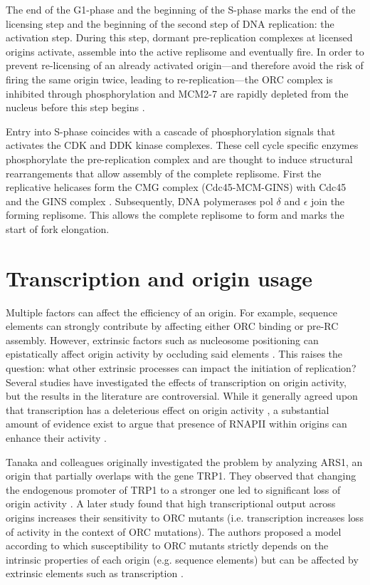 The end of the G1-phase and the beginning of the S-phase marks the end of the licensing step and the beginning of the second step of DNA replication: the activation step. 
During this step, dormant pre-replication complexes at licensed origins activate, assemble into the active replisome and eventually fire. 
In order to prevent re-licensing of an already activated origin—and therefore avoid the risk of firing the same origin twice, leading to re-replication—the ORC complex is  inhibited through phosphorylation and MCM2-7 are rapidly depleted from the nucleus before this step begins \cite{nguyen:2001:cyclindependent}. 


Entry into S-phase coincides with a cascade of phosphorylation signals that activates the CDK and DDK kinase complexes. 
These cell cycle specific enzymes phosphorylate the pre-replication complex and are thought to induce structural rearrangements that allow assembly of the complete replisome. 
First the replicative helicases form the CMG complex (Cdc45-MCM-GINS) with Cdc45 and the GINS complex \cite{moyer:2006:isolation, aparicio:2009:human}. 
Subsequently, DNA polymerases pol $\delta$ and $\epsilon$ join the forming replisome. 
This allows the complete replisome to form and marks the start of fork elongation.


\section{Transcription and origin usage}

Multiple factors can affect the efficiency of an origin.  
For example, sequence elements can strongly contribute by affecting either ORC binding or pre-RC assembly. 
However, extrinsic factors such as nucleosome positioning can epistatically affect origin activity by occluding said elements \cite{bodmerglavas:2001:rna}. 
This raises the question: what other extrinsic processes can impact the initiation of replication? Several studies have investigated the effects of transcription on origin activity, but the results in the literature are controversial. 
While it generally agreed upon that transcription has a deleterious effect on origin activity \cite{tanaka:1994:transcription,nieduszynski:2005:requirement}, a substantial amount of evidence exist to argue that presence of RNAPII within origins can enhance their activity \cite{yankulov:1999:mcm,gauthier:2002:role}. 


Tanaka and colleagues originally investigated the problem by analyzing ARS1, an origin that partially overlaps with the gene TRP1. 
They observed that changing the endogenous promoter of TRP1 to a stronger one led to significant loss of origin activity \cite{tanaka:1994:transcription}.
A later study found that high transcriptional output across origins increases their sensitivity to ORC mutants (i.e. transcription increases loss of activity in the context of ORC mutations). 
The authors proposed a model according to which susceptibility to ORC mutants strictly depends on the intrinsic properties of each origin (e.g. sequence elements) but can be affected by extrinsic elements such as transcription \cite{nieduszynski:2005:requirement}. 


